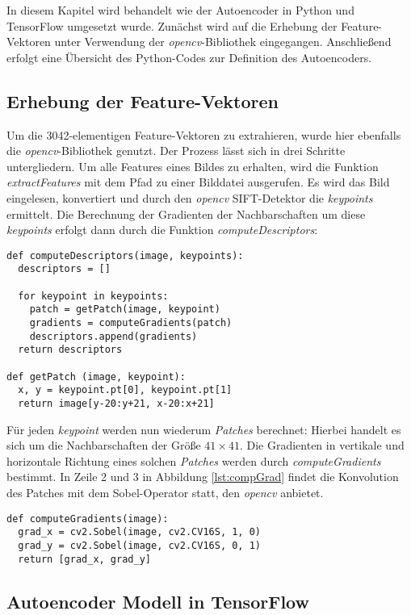 In diesem Kapitel wird behandelt wie der Autoencoder in Python und TensorFlow umgesetzt wurde. Zunächst wird auf die Erhebung der Feature-Vektoren unter Verwendung der \textit{opencv}-Bibliothek eingegangen. Anschließend erfolgt eine Übersicht des Python-Codes zur Definition des Autoencoders.

\subsection{Erhebung der Feature-Vektoren}

Um die 3042-elementigen Feature-Vektoren zu extrahieren, wurde hier ebenfalls die \textit{opencv}-Bibliothek genutzt. Der Prozess lässt sich in drei Schritte untergliedern. Um alle Features eines Bildes zu erhalten, wird die Funktion \textit{extractFeatures} mit dem Pfad zu einer Bilddatei ausgerufen. Es wird das Bild eingelesen, konvertiert und durch den \textit{opencv} SIFT-Detektor die \textit{keypoints} ermittelt. Die Berechnung der Gradienten der Nachbarschaften um diese \textit{keypoints} erfolgt dann durch die Funktion \textit{computeDescriptors}:

\lstset{language=Python}
\begin{lstlisting}
def computeDescriptors(image, keypoints):
  descriptors = []
  
  for keypoint in keypoints:
  	patch = getPatch(image, keypoint)
  	gradients = computeGradients(patch)
  	descriptors.append(gradients)
  return descriptors
  
def getPatch (image, keypoint):
  x, y = keypoint.pt[0], keypoint.pt[1]
  return image[y-20:y+21, x-20:x+21]
\end{lstlisting}

Für jeden \textit{keypoint} werden nun wiederum \textit{Patches} berechnet: Hierbei handelt es sich um die Nachbarschaften der Größe $41 \times 41$. Die Gradienten in vertikale und horizontale Richtung eines solchen \textit{Patches} werden durch \textit{computeGradients} bestimmt. In Zeile 2 und 3 in Abbildung \ref{lst:compGrad} findet die Konvolution des Patches mit dem Sobel-Operator statt, den \textit{opencv} anbietet.

\begin{lstlisting}
def computeGradients(image):
  grad_x = cv2.Sobel(image, cv2.CV16S, 1, 0)
  grad_y = cv2.Sobel(image, cv2.CV16S, 0, 1)
  return [grad_x, grad_y]
\end{lstlisting}

\subsection{Autoencoder Modell in TensorFlow}

